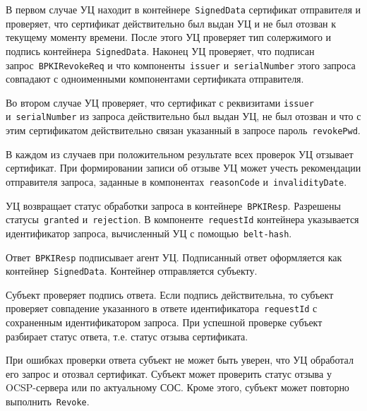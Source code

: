 В первом случае УЦ находит в контейнере~\texttt{SignedData}
сертификат отправителя и проверяет, что сертификат действительно 
был выдан УЦ и не был отозван к текущему моменту времени. 
После этого УЦ проверяет тип солержимого и подпись контейнера~\texttt{SignedData}. 
Наконец УЦ проверяет, что  подписан запрос~\texttt{BPKIRevokeReq} и что 
компоненты~\texttt{issuer} и~\texttt{serialNumber} этого запроса 
совпадают с одноименными компонентами сертификата отправителя.

Во втором случае УЦ проверяет, что сертификат с реквизитами 
\texttt{issuer} и~\texttt{serialNumber} из запроса действительно
был выдан УЦ, не был отозван и что с этим сертификатом действительно 
связан указанный в запросе пароль~\texttt{revokePwd}.

В каждом из случаев при положительном результате всех проверок
УЦ отзывает сертификат. При формировании записи об отзыве 
УЦ может учесть рекомендации отправителя запроса, заданные 
в компонентах~\texttt{reasonCode} и~\texttt{invalidityDate}.

УЦ возвращает статус обработки запроса в контейнере~\texttt{BPKIResp}.
Разрешены статусы~\texttt{granted} и~\texttt{rejection}.
В компоненте~\texttt{requestId} контейнера указывается идентификатор 
запроса, вычисленный УЦ с помощью~\texttt{belt-hash}.

Ответ~\texttt{BPKIResp} подписывает агент УЦ. 
Подписанный ответ оформляется как контейнер~\texttt{SignedData}. 
Контейнер отправляется субъекту.

Субъект проверяет подпись ответа. Если подпись действительна,
то субъект проверяет совпадение указанного в ответе 
идентификатора~\texttt{requestId} с сохраненным идентификатором запроса. 
При успешной проверке субъект разбирает статус ответа, т.е. статус отзыва 
сертификата. 

При ошибках проверки ответа субъект не может быть уверен, что УЦ обработал
его запрос и отозвал сертификат. Субъект может проверить статус отзыва
у OCSP-сервера или по актуальному СОС. Кроме этого, субъект может 
повторно выполнить~\texttt{Revoke}. 

